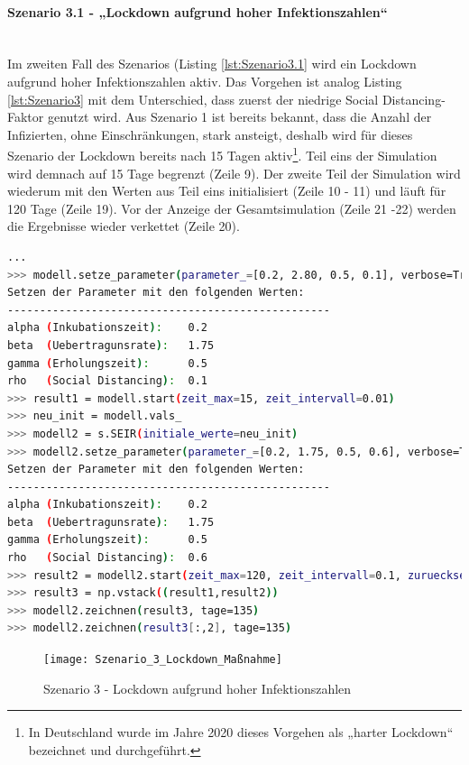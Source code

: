 \documentclass[12pt]{article}
\begin{document}
\paragraph{Szenario 3.1 - „Lockdown aufgrund hoher Infektionszahlen“}\mbox{} \\
Im zweiten Fall des Szenarios (Listing \ref{lst:Szenario3.1} wird ein Lockdown aufgrund hoher Infektionszahlen aktiv. Das Vorgehen ist analog Listing \ref{lst:Szenario3} mit dem Unterschied, dass zuerst der niedrige Social Distancing-Faktor genutzt wird. Aus Szenario 1 ist bereits bekannt, dass die Anzahl der Infizierten, ohne Einschränkungen, stark ansteigt, deshalb wird für dieses Szenario der Lockdown bereits nach 15 Tagen aktiv\footnote{In Deutschland wurde im Jahre 2020 dieses Vorgehen als „harter Lockdown“ bezeichnet und durchgeführt.}. Teil eins der Simulation wird demnach auf 15 Tage begrenzt (Zeile 9). Der zweite Teil der Simulation wird wiederum mit den Werten aus Teil eins initialisiert (Zeile 10 - 11) und läuft für 120 Tage (Zeile 19). Vor der Anzeige der Gesamtsimulation (Zeile 21 -22) werden die Ergebnisse wieder verkettet (Zeile 20).

\begin{lstlisting}[language=Bash, caption=Szenario 3.1 - „Lockdown aufgrund hoher Infektionszahlen“, label=lst:Szenario3.1]
...
>>> modell.setze_parameter(parameter_=[0.2, 2.80, 0.5, 0.1], verbose=True)
Setzen der Parameter mit den folgenden Werten:
--------------------------------------------------
alpha (Inkubationszeit):    0.2
beta  (Uebertragunsrate):   1.75
gamma (Erholungszeit):      0.5
rho   (Social Distancing):  0.1
>>> result1 = modell.start(zeit_max=15, zeit_intervall=0.01)
>>> neu_init = modell.vals_
>>> modell2 = s.SEIR(initiale_werte=neu_init)
>>> modell2.setze_parameter(parameter_=[0.2, 1.75, 0.5, 0.6], verbose=True)
Setzen der Parameter mit den folgenden Werten:
--------------------------------------------------
alpha (Inkubationszeit):    0.2
beta  (Uebertragunsrate):   1.75
gamma (Erholungszeit):      0.5
rho   (Social Distancing):  0.6
>>> result2 = modell2.start(zeit_max=120, zeit_intervall=0.1, zuruecksetzen=False)
>>> result3 = np.vstack((result1,result2))
>>> modell2.zeichnen(result3, tage=135)
>>> modell2.zeichnen(result3[:,2], tage=135)
\end{lstlisting}

\begin{figure}[H]
\centering
\texttt{[image: Szenario\_3\_Lockdown\_Maßnahme]}
\caption{Szenario 3 - Lockdown aufgrund hoher Infektionszahlen}
\label{fig:szenario_3_1}
\end{figure}
\end{document}
